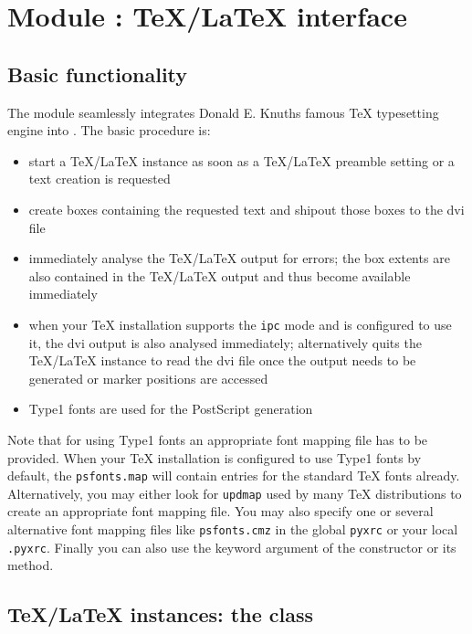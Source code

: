 \chapter[Module \module{text}: TeX/LaTeX interface]{Module : \TeX/\LaTeX{} interface}
\label{module:text}

\section{Basic functionality}

The  module seamlessly integrates Donald E. Knuths famous
\TeX{} typesetting engine into \PyX. The basic procedure is:
\begin{itemize}
\item start a \TeX/\LaTeX{} instance as soon as a \TeX/\LaTeX{}
preamble setting or a text creation is requested
\item create boxes containing the requested text and shipout those
boxes to the dvi file
\item immediately analyse the \TeX/\LaTeX{} output for errors; the box
extents are also contained in the \TeX/\LaTeX{} output and thus become
available immediately
\item when your TeX installation supports the \texttt{ipc} mode and
\PyX{} is configured to use it, the dvi output is also analysed
immediately; alternatively \PyX{} quits the \TeX/\LaTeX{} instance to
read the dvi file once the output needs to be generated or marker
positions are accessed
\item Type1 fonts are used for the PostScript generation
\end{itemize}

Note that for using Type1 fonts an appropriate font mapping file has
to be provided. When your \TeX{} installation is configured to use
Type1 fonts by default, the \texttt{psfonts.map} will contain entries
for the standard \TeX{} fonts already. Alternatively, you may either
look for \texttt{updmap} used by many \TeX{} distributions to create
an appropriate font mapping file. You may also specify one or several
alternative font mapping files like \texttt{psfonts.cmz} in the global
\texttt{pyxrc} or your local \texttt{.pyxrc}. Finally you can also use
the  keyword argument of the 
constructor or its  method.

\section[TeX/LaTeX instances: the \class{texrunner} class]%
{\TeX/\LaTeX{} instances: the  class}

